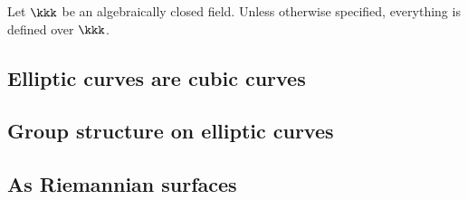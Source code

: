 Let \(\kkk\) be an algebraically closed field.
Unless otherwise specified, everything is defined over \(\kkk\).

\subsection{Elliptic curves are cubic curves}


\subsection{Group structure on elliptic curves}


\subsection{As Riemannian surfaces}
